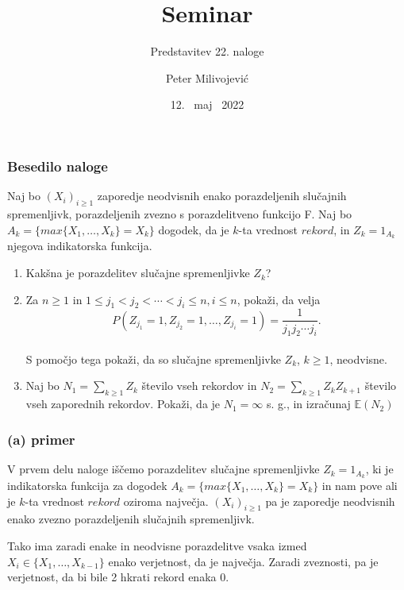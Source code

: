 \documentclass[12pt, hyperref={unicode}]{beamer}
\title{Seminar}
\subtitle{Predstavitev 22. naloge}
\author{Peter Milivojević}
\institute[FMF]{Fakulteta za matematiko in fiziko}
\date{12. \ maj \ 2022}
\begin{document}
\begin{frame}
    \titlepage
\end{frame}      
     


\begin{frame}
   
  \frametitle{Besedilo naloge}
  Naj bo $ (X_i)_{i\geq1} $ zaporedje neodvisnih enako porazdeljenih slučajnih spremenljivk,
  porazdeljenih zvezno s porazdelitveno funkcijo F.
  Naj bo $A_k = \{max\{ X_1, \dots , X_k \} = X_k\}$ dogodek,
  da je $k$-ta vrednost $rekord$,
  in $Z_k = 1_{A_k}$ njegova indikatorska funkcija.

  \begin{enumerate}[a]
    \item Kakšna je porazdelitev slučajne spremenljivke $Z_k$?
    \item Za $n \geq 1$ in $1 \leq j_1 < j_2 < \cdots < j_i \leq n, i \leq n$, pokaži, da velja 
    $$P(Z_{j_1} = 1, Z_{j_2} = 1, \dots, Z_{j_i} = 1) = \frac{1}{j_1j_2 \cdots j_i} .$$\\
    S pomočjo tega pokaži, da so slučajne spremenljivke $Z_k$, $k \geq 1$, neodvisne.
    \item  Naj bo $N_1 = \sum_{k\geq1} Z_k $ število vseh rekordov in $N_2 = \sum_{k\geq1} Z_k Z_{k+1}$ število vseh
    zaporednih rekordov. Pokaži, da je $N_1 = \infty $ s. g., in izračunaj $\mathbb{E}(N_2)$
  \end{enumerate}

\end{frame}

\begin{frame}
   
  \frametitle{(a) primer}
  V prvem delu naloge iščemo porazdelitev slučajne spremenljivke
  $Z_k = 1_{A_k}$, ki je indikatorska funkcija za dogodek
  $A_k = \{max\{ X_1, \dots , X_k \} = X_k\}$ in nam pove ali je
  $k$-ta vrednost $rekord$ oziroma največja. $(X_i)_{i\geq1}$ 
  pa je zaporedje neodvisnih enako zvezno porazdeljenih slučajnih spremenljivk.\\
  \vspace{3mm}

  Tako ima zaradi enake in neodvisne porazdelitve vsaka izmed $X_i \in \{X_1, \dots , X_{k-1}\}$
  enako verjetnost, da je največja. Zaradi zveznosti, pa je verjetnost, da bi bile 2 hkrati rekord enaka 0.
  

\end{frame}
\end{document}
